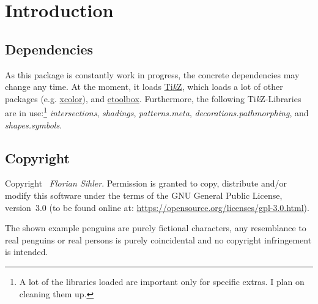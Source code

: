 \documentclass[parskip=half,english,numbers=noenddot,footnotes=nomultiple,oneside]{scrartcl}
\def\TikZ{Ti\textit{k}Z}
\begin{document}
\begin{center}
{}
\end{center}
\vfill\null

\clearpage\section{Introduction}
\subsection{Dependencies}

As this package is constantly work in progress, the concrete dependencies may change any time.
At the moment, it loads \href{https://www.ctan.org/pkg/pgf}{\TikZ}, which loads a lot of other packages (e.g. \href{https://www.ctan.org/pkg/xcolor}{xcolor}), and \href{https://www.ctan.org/pkg/etoolbox}{etoolbox}.
Furthermore, the following \TikZ-Libraries are in use:\footnote{A lot of the libraries loaded are important only for specific extras. I plan on cleaning them up.} \textit{intersections}, \textit{shadings}, \textit{patterns.meta}, \textit{decorations.pathmorphing}, and \textit{shapes.symbols}.

\subsection{Copyright}

Copyright \textcopyright\ \textit{Florian Sihler}. Permission is granted to copy, distribute and\slash or modify this software under the terms of the GNU General Public License, version~3.0 (to be found online at: \url{https://opensource.org/licenses/gpl-3.0.html}).

The shown example penguins are purely fictional characters, any resemblance to real penguins or real persons is purely coincidental and no copyright infringement is intended.
\end{document}
